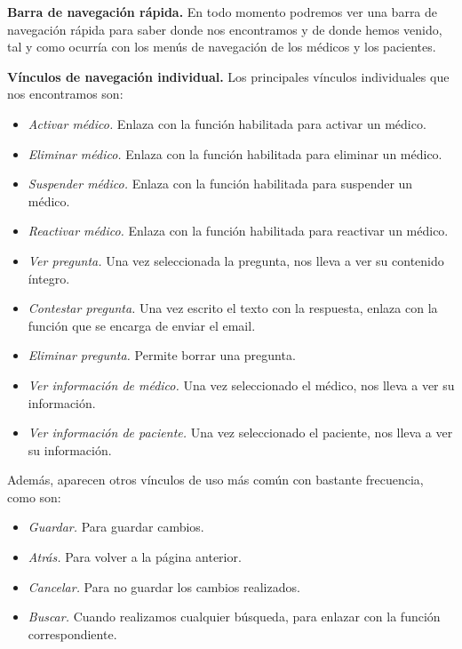 \documentclass[a4paper,oneside,11pt]{book}
\begin{document}
		\textbf{Barra de navegación rápida.} En todo momento podremos ver una barra de navegación rápida para saber donde nos encontramos y de donde hemos venido, tal y como ocurría con los menús de navegación de los médicos y los pacientes.
		
		\textbf{Vínculos de navegación individual.} Los principales vínculos individuales que nos encontramos son:
		\begin{itemize}
			\item \textit{Activar médico.} Enlaza con la función habilitada para activar un médico.
			\item \textit{Eliminar médico.} Enlaza con la función habilitada para eliminar un médico.
			\item \textit{Suspender médico.} Enlaza con la función habilitada para suspender un médico.
			\item \textit{Reactivar médico.} Enlaza con la función habilitada para reactivar un médico. 
			\item \textit{Ver pregunta.} Una vez seleccionada la pregunta, nos lleva a ver su contenido íntegro.
			\item \textit{Contestar pregunta.} Una vez escrito el texto con la respuesta, enlaza con la función que se encarga de enviar el email.
			\item \textit{Eliminar pregunta.} Permite borrar una pregunta.
			\item \textit{Ver información de médico.} Una vez seleccionado el médico, nos lleva a ver su información.
			\item \textit{Ver información de paciente.} Una vez seleccionado el paciente, nos lleva a ver su información.
		\end{itemize}
		
		Además, aparecen otros vínculos de uso más común con bastante frecuencia, como son:
		\begin{itemize}
			\item \textit{Guardar.} Para guardar cambios.
			\item \textit{Atrás.} Para volver a la página anterior.
			\item \textit{Cancelar.} Para no guardar los cambios realizados.
			\item \textit{Buscar.} Cuando realizamos cualquier búsqueda, para enlazar con la función correspondiente.
		\end{itemize}
		
		
		
\end{document}
